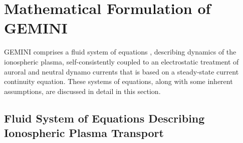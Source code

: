 \documentclass[11pt,letterpaper]{article}
\begin{document}
\section{Mathematical Formulation of GEMINI}

GEMINI comprises a fluid system of equations \citep{Schunk:1977,Blelly:1993,Huba:2000}, describing dynamics of the ionospheric plasma, self-consistently coupled to an electrostatic treatment of auroral and neutral dynamo currents that is based on a steady-state current continuity equation.  These systems of equations, along with some inherent assumptions, are discussed in detail in this section.  


\subsection{Fluid System of Equations Describing Ionospheric Plasma Transport}
\end{document}
